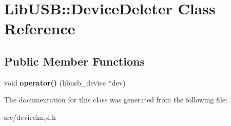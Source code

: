 \hypertarget{class_lib_u_s_b_1_1_device_deleter}{\section{Lib\-U\-S\-B\-:\-:Device\-Deleter Class Reference}
\label{class_lib_u_s_b_1_1_device_deleter}
}
\subsection*{Public Member Functions}
\begin{DoxyCompactItemize}
\item 
\hypertarget{class_lib_u_s_b_1_1_device_deleter_ae7d7c29724f8e906f36dbcc27d68331c}{void {\bfseries operator()} (libusb\-\_\-device $\ast$dev)}\label{class_lib_u_s_b_1_1_device_deleter_ae7d7c29724f8e906f36dbcc27d68331c}

\end{DoxyCompactItemize}


The documentation for this class was generated from the following file\-:\begin{DoxyCompactItemize}
\item 
src/deviceimpl.\-h\end{DoxyCompactItemize}
